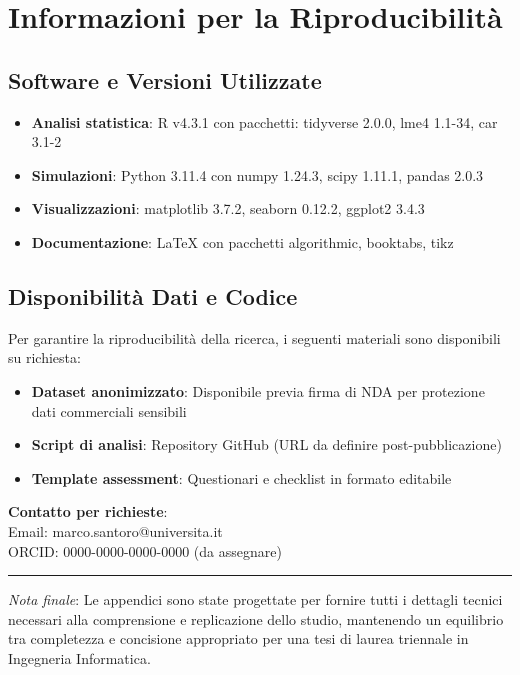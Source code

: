 \section{\texorpdfstring{Informazioni per la Riproducibilità}{D.4 - Informazioni per la Riproducibilità}}

\subsection{\texorpdfstring{Software e Versioni Utilizzate}{D.4.1 - Software e Versioni Utilizzate}}

\begin{itemize}
    \item \textbf{Analisi statistica}: R v4.3.1 con pacchetti: tidyverse 2.0.0, lme4 1.1-34, car 3.1-2
    \item \textbf{Simulazioni}: Python 3.11.4 con numpy 1.24.3, scipy 1.11.1, pandas 2.0.3
    \item \textbf{Visualizzazioni}: matplotlib 3.7.2, seaborn 0.12.2, ggplot2 3.4.3
    \item \textbf{Documentazione}: LaTeX con pacchetti algorithmic, booktabs, tikz
\end{itemize}

\subsection{\texorpdfstring{Disponibilità Dati e Codice}{D.4.2 - Disponibilità Dati e Codice}}

Per garantire la riproducibilità della ricerca, i seguenti materiali sono disponibili su richiesta:

\begin{itemize}
    \item \textbf{Dataset anonimizzato}: Disponibile previa firma di NDA per protezione dati commerciali sensibili
    \item \textbf{Script di analisi}: Repository GitHub (URL da definire post-pubblicazione)
    \item \textbf{Template assessment}: Questionari e checklist in formato editabile
\end{itemize}

\textbf{Contatto per richieste}: \\
Email: marco.santoro@universita.it \\
ORCID: 0000-0000-0000-0000 (da assegnare)

\vspace{1cm}

\noindent\rule{\textwidth}{0.4pt}

\textit{Nota finale}: Le appendici sono state progettate per fornire tutti i dettagli tecnici necessari alla comprensione e replicazione dello studio, mantenendo un equilibrio tra completezza e concisione appropriato per una tesi di laurea triennale in Ingegneria Informatica.